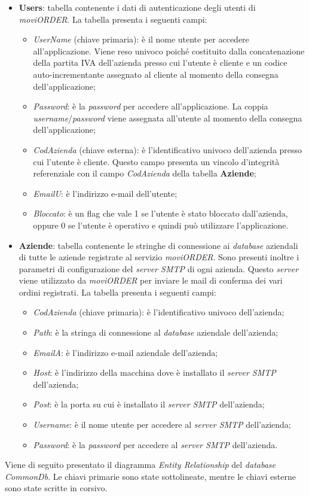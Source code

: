 \begin{itemize}
	\item \textbf{Users}: tabella contenente i dati di autenticazione degli utenti di \textit{moviORDER}. La tabella presenta i seguenti campi:
		\begin{itemize}
			\item \textit{UserName} (chiave primaria): è il nome utente per accedere all'applicazione. Viene reso univoco poiché costituito dalla concatenazione della partita IVA dell'azienda presso cui l'utente è cliente e un codice auto-incrementante assegnato al cliente al momento della consegna dell'applicazione;
			\item \textit{Password}: è la \textit{password} per accedere all'applicazione. La coppia \textit{username}/\textit{password} viene assegnata all'utente al momento della consegna dell'applicazione;
			\item \textit{CodAzienda} (chiave esterna): è l'identificativo univoco dell'azienda presso cui l'utente è cliente. Questo campo presenta un vincolo d'integrità referenziale con il campo \textit{CodAzienda} della tabella \textbf{Aziende};
			\item \textit{EmailU}: è l'indirizzo e-mail dell'utente;
			\item \textit{Bloccato}: è un flag che vale 1 se l'utente è stato bloccato dall'azienda, oppure 0 se l'utente è operativo e quindi può utilizzare l'applicazione.
		\end{itemize}
	\item \textbf{Aziende}: tabella contenente le stringhe di connessione ai \textit{database} aziendali di tutte le aziende registrate al servizio \textit{moviORDER}. Sono presenti inoltre i parametri di configurazione del \textit{server SMTP} di ogni azienda. Questo \textit{server} viene utilizzato da \textit{moviORDER} per inviare le mail di conferma dei vari ordini registrati. La tabella presenta i seguenti campi:
	\begin{itemize}
		\item \textit{CodAzienda} (chiave primaria): è l'identificativo univoco dell'azienda;
		\item \textit{Path}: è la stringa di connessione al \textit{database} aziendale dell'azienda;
		\item \textit{EmailA}: è l'indirizzo e-mail aziendale dell'azienda;
		\item \textit{Host}: è l'indirizzo della macchina dove è installato il \textit{server SMTP} dell'azienda;
		\item \textit{Post}: è la porta su cui è installato il \textit{server SMTP} dell'azienda;
		\item \textit{Username}: è il nome utente per accedere al \textit{server SMTP} dell'azienda;
		\item \textit{Password}: è la \textit{password} per accedere al \textit{server SMTP} dell'azienda.
	\end{itemize}
\end{itemize}
Viene di seguito presentato il diagramma \textit{Entity Relationship} del \textit{database} \textit{CommonDb}. Le chiavi primarie sono state sottolineate, mentre le chiavi esterne sono state scritte in corsivo.

